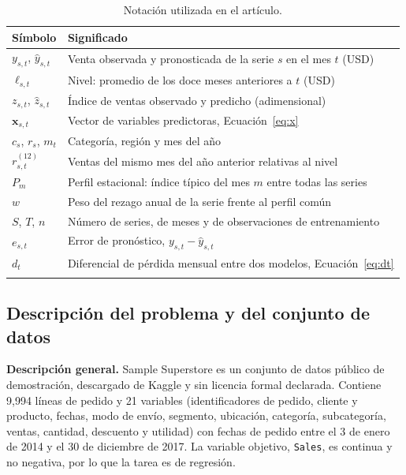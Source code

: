 \documentclass[pdflatex,sn-mathphys-num]{sn-jnl}
\begin{document}
\begin{table}[!htb]
\caption{Notación utilizada en el artículo.}\label{tab:notacion}
\begin{tabular}{@{}ll@{}}
\toprule
Símbolo & Significado \\
\midrule
$y_{s,t}$, $\hat{y}_{s,t}$ & Venta observada y pronosticada de la serie $s$ en el mes $t$ (USD) \\
$\ell_{s,t}$ & Nivel: promedio de los doce meses anteriores a $t$ (USD) \\
$z_{s,t}$, $\hat{z}_{s,t}$ & Índice de ventas observado y predicho (adimensional) \\
$\mathbf{x}_{s,t}$ & Vector de variables predictoras, Ecuación~\eqref{eq:x} \\
$c_s$, $r_s$, $m_t$ & Categoría, región y mes del año \\
$r^{(12)}_{s,t}$ & Ventas del mismo mes del año anterior relativas al nivel \\
$P_m$ & Perfil estacional: índice típico del mes $m$ entre todas las series \\
$w$ & Peso del rezago anual de la serie frente al perfil común \\
$S$, $T$, $n$ & Número de series, de meses y de observaciones de entrenamiento \\
$e_{s,t}$ & Error de pronóstico, $y_{s,t}-\hat{y}_{s,t}$ \\
$d_t$ & Diferencial de pérdida mensual entre dos modelos, Ecuación~\eqref{eq:dt} \\
\botrule
\end{tabular}
\end{table}

\subsection{Descripción del problema y del conjunto de datos}\label{subsec:datos}

\textbf{Descripción general.} Sample Superstore \cite{superstore} es un conjunto de datos público de demostración, descargado de Kaggle y sin licencia formal declarada. Contiene 9{,}994 líneas de pedido y 21 variables (identificadores de pedido, cliente y producto, fechas, modo de envío, segmento, ubicación, categoría, subcategoría, ventas, cantidad, descuento y utilidad) con fechas de pedido entre el 3 de enero de 2014 y el 30 de diciembre de 2017. La variable objetivo, \texttt{Sales}, es continua y no negativa, por lo que la tarea es de regresión.
\end{document}
